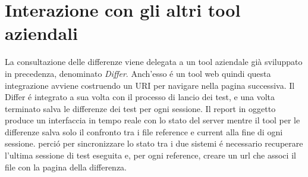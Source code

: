             \section{Interazione con gli altri tool aziendali}
            La consultazione delle differenze viene delegata a un tool aziendale già sviluppato in precedenza, denominato \textit{Differ}.
            Anch'esso \'e un tool web quindi questa integrazione avviene  costruendo un URI per navigare nella pagina successiva.
            Il Differ \'e integrato a sua volta con il processo di lancio dei test, e una volta terminato salva le differenze dei test per ogni sessione.
            Il report in oggetto produce un interfaccia in tempo reale con lo stato del server mentre il tool per le differenze salva solo il confronto tra i file reference e current alla fine di ogni sessione.
        perci\'o per sincronizzare lo stato tra i due sistemi \'e necessario recuperare l'ultima sessione di test eseguita e, per ogni reference, creare un url che associ il file con la pagina della differenza.